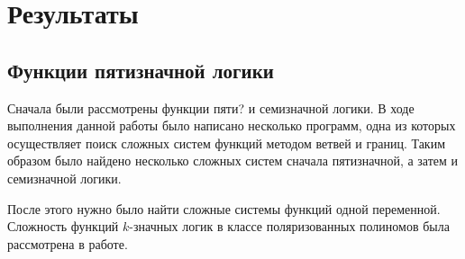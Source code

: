 \documentclass[bibliography=totoc, a4paper, 12pt]{extarticle}
\let\stdsection\section
\renewcommand\section{\newpage\stdsection}
\begin{document}
\section{Результаты}

\subsection{Функции пятизначной логики}

Сначала были рассмотрены функции пяти? и семизначной логики. В ходе выполнения
данной работы было написано несколько программ, одна из которых осуществляет
поиск сложных систем функций методом ветвей и границ. Таким образом было найдено
несколько сложных систем сначала пятизначной, а затем и семизначной логики.

После этого нужно было найти сложные системы функций одной переменной. Сложность
функций $k$-значных логик в классе поляризованных полиномов была рассмотрена в
работе\cite{ss04}.
\end{document}
